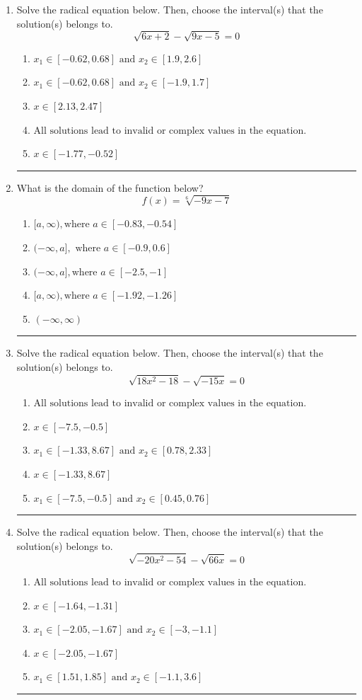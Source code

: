 \documentclass[14pt]{extbook}
\newcommand{\litem}[1]{\item#1\hspace*{-1cm}\rule{\textwidth}{0.4pt}}
\begin{document}
\begin{enumerate}
\litem{
Solve the radical equation below. Then, choose the interval(s) that the solution(s) belongs to.\[ \sqrt{6 x + 2} - \sqrt{9 x - 5} = 0 \]\begin{enumerate}[label=\Alph*.]
\item \( x_1 \in [-0.62, 0.68] \text{ and } x_2 \in [1.9,2.6] \)
\item \( x_1 \in [-0.62, 0.68] \text{ and } x_2 \in [-1.9,1.7] \)
\item \( x \in [2.13,2.47] \)
\item \( \text{All solutions lead to invalid or complex values in the equation.} \)
\item \( x \in [-1.77,-0.52] \)

\end{enumerate} }
\litem{
What is the domain of the function below?\[ f(x) = \sqrt[6]{-9 x - 7} \]\begin{enumerate}[label=\Alph*.]
\item \( [a, \infty), \text{where } a \in [-0.83, -0.54] \)
\item \( (-\infty, a], \text{ where } a \in [-0.9, 0.6] \)
\item \( (-\infty, a], \text{where } a \in [-2.5, -1] \)
\item \( [a, \infty), \text{where } a \in [-1.92, -1.26] \)
\item \( (-\infty, \infty) \)

\end{enumerate} }
\litem{
Solve the radical equation below. Then, choose the interval(s) that the solution(s) belongs to.\[ \sqrt{18 x^2 - 18} - \sqrt{-15 x} = 0 \]\begin{enumerate}[label=\Alph*.]
\item \( \text{All solutions lead to invalid or complex values in the equation.} \)
\item \( x \in [-7.5,-0.5] \)
\item \( x_1 \in [-1.33, 8.67] \text{ and } x_2 \in [0.78,2.33] \)
\item \( x \in [-1.33,8.67] \)
\item \( x_1 \in [-7.5, -0.5] \text{ and } x_2 \in [0.45,0.76] \)

\end{enumerate} }
\litem{
Solve the radical equation below. Then, choose the interval(s) that the solution(s) belongs to.\[ \sqrt{-20 x^2 - 54} - \sqrt{66 x} = 0 \]\begin{enumerate}[label=\Alph*.]
\item \( \text{All solutions lead to invalid or complex values in the equation.} \)
\item \( x \in [-1.64,-1.31] \)
\item \( x_1 \in [-2.05, -1.67] \text{ and } x_2 \in [-3,-1.1] \)
\item \( x \in [-2.05,-1.67] \)
\item \( x_1 \in [1.51, 1.85] \text{ and } x_2 \in [-1.1,3.6] \)


\end{enumerate}}
\end{enumerate}
\end{document}
